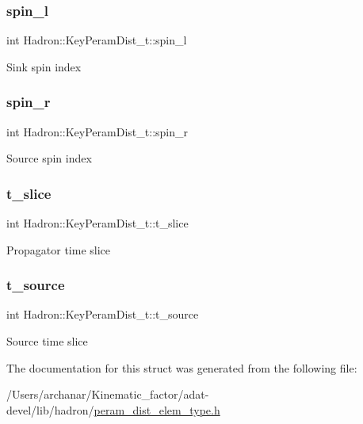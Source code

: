 \subsubsection{\texorpdfstring{spin\_l}{spin\_l}}
{\footnotesize\ttfamily int Hadron\+::\+Key\+Peram\+Dist\+\_\+t\+::spin\+\_\+l}

Sink spin index \mbox{\label{structHadron_1_1KeyPeramDist__t_ae222119223bd2bdd94a9ce4c08807dc3}} 
\subsubsection{\texorpdfstring{spin\_r}{spin\_r}}
{\footnotesize\ttfamily int Hadron\+::\+Key\+Peram\+Dist\+\_\+t\+::spin\+\_\+r}

Source spin index \mbox{\label{structHadron_1_1KeyPeramDist__t_a87f2be4569ea23f3aa0d3560fc0ddcb5}} 
\subsubsection{\texorpdfstring{t\_slice}{t\_slice}}
{\footnotesize\ttfamily int Hadron\+::\+Key\+Peram\+Dist\+\_\+t\+::t\+\_\+slice}

Propagator time slice \mbox{\label{structHadron_1_1KeyPeramDist__t_a71636c4b4d1d7b0be579f932d54ceb35}} 
\subsubsection{\texorpdfstring{t\_source}{t\_source}}
{\footnotesize\ttfamily int Hadron\+::\+Key\+Peram\+Dist\+\_\+t\+::t\+\_\+source}

Source time slice 

The documentation for this struct was generated from the following file\+:\begin{DoxyCompactItemize}
\item 
/\+Users/archanar/\+Kinematic\+\_\+factor/adat-\/devel/lib/hadron/\mbox{\hyperlink{adat-devel_2lib_2hadron_2peram__dist__elem__type_8h}{peram\+\_\+dist\+\_\+elem\+\_\+type.\+h}}\end{DoxyCompactItemize}
